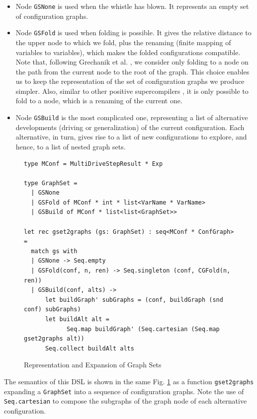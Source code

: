 \documentclass[submission,copyright,creativecommons]{eptcs}
\begin{document}
\begin{itemize}
  \item Node \verb|GSNone| is used when the whistle has blown. 
    It represents an empty set of configuration graphs.
  \item Node \verb|GSFold| is used when folding is possible. 
    It gives the relative distance to the upper node to which we fold, 
    plus the renaming (finite mapping of variables to variables), which makes the folded configurations compatible.
    Note that, following Grechanik et al. \cite{Romanenko2014StagedMRSC}, we consider
    only folding to a node on the path from the current node to the root of the graph.
    This choice enables us to keep the representation of the
    set of configuration graphs we produce simpler.
    Also, similar to other positive supercompilers \cite{Sorensen1994TurchinSupercompiler,sorm98b,TMR/SCP2014},
    it is only possible to fold to a node, which is a renaming of the current one.
  \item Node \verb|GSBuild| is the most complicated one, representing a list
    of alternative developments (driving or generalization) of the current configuration.
    Each alternative, in turn, gives rise to a list of new configurations to explore,
    and hence, to a list of nested graph sets.
\end{itemize}

\begin{figure}
\begin{lstlisting}
type MConf = MultiDriveStepResult * Exp

type GraphSet =
  | GSNone
  | GSFold of MConf * int * list<VarName * VarName>
  | GSBuild of MConf * list<list<GraphSet>>

let rec gset2graphs (gs: GraphSet) : seq<MConf * ConfGraph> =
  match gs with
  | GSNone -> Seq.empty
  | GSFold(conf, n, ren) -> Seq.singleton (conf, CGFold(n, ren)) 
  | GSBuild(conf, alts) ->
      let buildGraph' subGraphs = (conf, buildGraph (snd conf) subGraphs)
      let buildAlt alt = 
            Seq.map buildGraph' (Seq.cartesian (Seq.map gset2graphs alt))
      Seq.collect buildAlt alts
\end{lstlisting}
\caption{Representation and Expansion of Graph Sets}
\label{fig:GraphSet}
\end{figure}

The semantics of this DSL is shown in the same Fig. \ref{fig:GraphSet} as
a function \verb|gset2graphs| expanding a \verb|GraphSet| into a sequence 
of configuration graphs.
Note the use of \verb|Seq.cartesian| to compose the subgraphs of 
the graph node of each alternative configuration.
\end{document}
